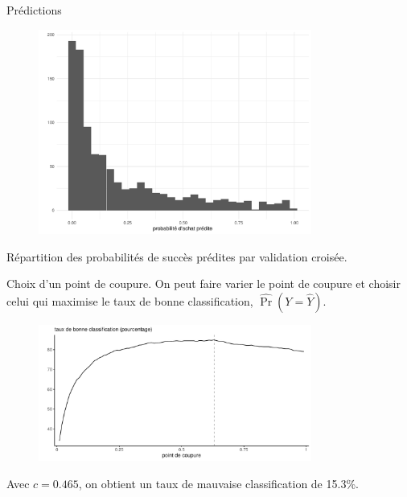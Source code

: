 \documentclass[
  ignorenonframetext,
]{beamer}
\begin{document}
\begin{frame}{Prédictions}
\protect\hypertarget{pruxe9dictions}{}
\begin{figure}

{\centering \includegraphics[width=0.8\textwidth,height=\textheight]{MATH60602-diapos6_files/figure-beamer/figclassification0-1.pdf}

}

\end{figure}

\footnotesize

Répartition des probabilités de succès prédites par validation croisée.

\normalsize
\end{frame}

\begin{frame}{Choix d'un point de coupure.}
\protect\hypertarget{choix-dun-point-de-coupure.}{}
On peut faire varier le point de coupure et choisir celui qui maximise
le taux de bonne classification, \(\widehat{\Pr}(Y = \widehat{Y})\).

\begin{figure}

{\centering \includegraphics[width=0.8\textwidth,height=\textheight]{MATH60602-diapos6_files/figure-beamer/unnamed-chunk-4-1.pdf}

}

\end{figure}

Avec \(c=0.465\), on obtient un taux de mauvaise classification de
15.3\%.
\end{frame}
\end{document}
